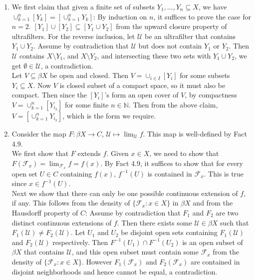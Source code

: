 \documentclass{article}
\begin{document}
\begin{enumerate}
  \item We first claim that given a finite set of subsets
    $Y_1,\ldots,Y_n\subseteq X$, we have
    $\cup_{k=1}^n[Y_k]=[\cup_{k=1}^nY_k]$: By induction on $n$, it suffices
    to prove the case for $n=2$.  $[Y_1]\cup[Y_2]\subseteq[Y_1\cup Y_2]$
    from the upward closure property of ultrafilters. For the reverse
    inclusion, let $\mathcal{U}$ be an ultrafilter that contains $Y_1\cup
    Y_2$. Assume by contradiction that $\mathcal{U}$ but does not contain
    $Y_1$ or $Y_2$. Then $\mathcal{U}$ contains $X\setminus Y_1$, and
    $X\setminus Y_2$, and intersecting these two sets with $Y_1\cup Y_2$,
    we get $\emptyset\in\mathcal{U}$, a contradiction. \\
  
    Let $V\subseteq\beta X$ be open and closed. Then $V=\cup_{i\in
    I}[Y_i]$ for some subsets $Y_i\subseteq X$. Now $V$ is closed subset of
    a compact space, so it must also be compact. Then since the $[Y_i]$'s
    form an open cover of $V$, by compactness $V=\cup_{k=1}^n[Y_{i_k}]$ for
    some finite $n\in\mathbb{N}$. Then from the above claim,
    $V=[\cup_{k=1}^nY_{i_k}]$, which is the form we require.

  \item Consider the map $F:\beta X\rightarrow C$,
    $\mathcal{U}\mapsto\lim_{\mathcal{U}}f$. This map is well-defined by
    Fact 4.9. \\

    We first show that $F$ extends $f$. Given $x\in X$, we need to show
    that $F(\mathcal{F}_x)=\lim_{\mathcal{F}_x}f=f(x)$. By Fact 4.9, it
    suffices to show that for every open set $U\in C$ containing $f(x)$,
    $f^{-1}(U)$ is contained in $\mathcal{F}_x$. This is true since $x\in
    f^{-1}(U)$. \\

    Next we show that there can only be one possible continuous extension
    of $f$, if any. This follows from the density of $\{\mathcal{F}_x:x\in
    X\}$ in $\beta X$ and from the Hausdorff property of $C$: Assume by
    contradiction that $F_1$ and $F_2$ are two distinct continuous
    extensions of $f$. Then there exists some $\mathcal{U}\in\beta X$ such
    that $F_1(\mathcal{U})\neq F_2(\mathcal{U})$. Let $U_1$ and $U_2$ be
    disjoint open sets containing $F_1(\mathcal{U})$ and $F_2(\mathcal{U})$
    respectively. Then $F^{-1}(U_1)\cap F^{-1}(U_2)$ is an open subset of
    $\beta X$ that contains $\mathcal{U}$, and this open subset must
    contain some $\mathcal{F}_x$ from the density of $\{\mathcal{F}_x:x\in
    X\}$. However $F_1(\mathcal{F}_x)$ and $F_2(\mathcal{F}_x)$ are
    contained in disjoint neighborhoods and hence cannot be equal, a
    contradiction. \\


\end{enumerate}
\end{document}
